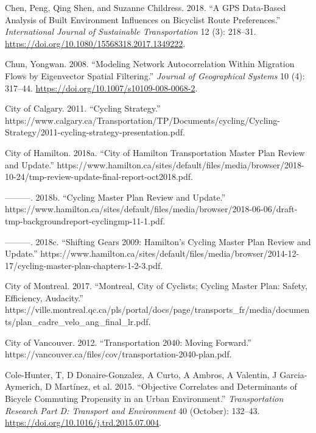 \documentclass[smallextended]{svjour3}       %
\begin{document}
\leavevmode\hypertarget{ref-Chen2018}{}%
Chen, Peng, Qing Shen, and Suzanne Childress. 2018. ``A GPS Data-Based
Analysis of Built Environment Influences on Bicyclist Route
Preferences.'' \emph{International Journal of Sustainable
Transportation} 12 (3): 218--31.
\url{https://doi.org/10.1080/15568318.2017.1349222}.

\leavevmode\hypertarget{ref-Chun2008}{}%
Chun, Yongwan. 2008. ``Modeling Network Autocorrelation Within Migration
Flows by Eigenvector Spatial Filtering.'' \emph{Journal of Geographical
Systems} 10 (4): 317--44.
\url{https://doi.org/10.1007/s10109-008-0068-2}.

\leavevmode\hypertarget{ref-Calgary2011}{}%
City of Calgary. 2011. ``Cycling Strategy.''
https://www.calgary.ca/Transportation/TP/Documents/cycling/Cycling-Strategy/2011-cycling-strategy-presentation.pdf.

\leavevmode\hypertarget{ref-Tmp2018}{}%
City of Hamilton. 2018a. ``City of Hamilton Transportation Master Plan
Review and Update.''
https://www.hamilton.ca/sites/default/files/media/browser/2018-10-24/tmp-review-update-final-report-oct2018.pdf.

\leavevmode\hypertarget{ref-Cmp2018}{}%
---------. 2018b. ``Cycling Master Plan Review and Update.''
https://www.hamilton.ca/sites/default/files/media/browser/2018-06-06/draft-tmp-backgroundreport-cyclingmp-11-1.pdf.

\leavevmode\hypertarget{ref-Cmp2009}{}%
---------. 2018c. ``Shifting Gears 2009: Hamilton's Cycling Master Plan
Review and Update.''
https://www.hamilton.ca/sites/default/files/media/browser/2014-12-17/cycling-master-plan-chapters-1-2-3.pdf.

\leavevmode\hypertarget{ref-Montreal2017}{}%
City of Montreal. 2017. ``Montreal, City of Cyclists; Cycling Master
Plan: Safety, Efficiency, Audacity.''
https://ville.montreal.qc.ca/pls/portal/docs/page/transports\_fr/media/documents/plan\_cadre\_velo\_ang\_final\_lr.pdf.

\leavevmode\hypertarget{ref-Vancouver2012}{}%
City of Vancouver. 2012. ``Transportation 2040: Moving Forward.''
https://vancouver.ca/files/cov/transportation-2040-plan.pdf.

\leavevmode\hypertarget{ref-ColeHunter2015}{}%
Cole-Hunter, T, D Donaire-Gonzalez, A Curto, A Ambros, A Valentin, J
Garcia-Aymerich, D Martínez, et al. 2015. ``Objective Correlates and
Determinants of Bicycle Commuting Propensity in an Urban Environment.''
\emph{Transportation Research Part D: Transport and Environment} 40
(October): 132--43. \url{https://doi.org/10.1016/j.trd.2015.07.004}.
\end{document}
